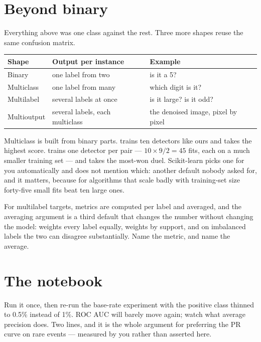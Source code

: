 \documentclass[11pt,a4paper]{article}
\begin{document}
\section{Beyond binary}

Everything above was one class against the rest. Three more shapes reuse the
same confusion matrix.

\begin{center}
\small
\begin{tabular}{llp{}}
\toprule
\textbf{Shape} & \textbf{Output per instance} & \textbf{Example} \\
\midrule
Binary       & one label from two            & is it a 5? \\
Multiclass   & one label from many           & which digit is it? \\
Multilabel   & several labels at once        & is it large? is it odd? \\
Multioutput  & several labels, each multiclass & the denoised image, pixel by
                                                pixel \\
\bottomrule
\end{tabular}
\end{center}

Multiclass is built from binary parts.  trains ten
detectors like ours and takes the highest score.  trains
one detector per pair --- $10\times9/2 = 45$ fits, each on a much smaller
training set --- and takes the most-won duel. Scikit-learn picks one for you
automatically and does not mention which: another default nobody asked for, and
it matters, because for algorithms that scale badly with training-set size
forty-five small fits beat ten large ones.

For multilabel targets, metrics are computed per label and averaged, and the
averaging argument is a third default that changes the number without changing
the model:  weights every label equally,
 weights by support, and on imbalanced labels the two
can disagree substantially. Name the metric, and name the average.

\section{The notebook}

\begin{trybox}[title={What to change}]
Run it once, then re-run the base-rate experiment with the positive class
thinned to 0.5\% instead of 1\%. ROC AUC will barely move again; watch what
average precision does. Two lines, and it is the whole argument for preferring
the PR curve on rare events --- measured by you rather than asserted here.
\end{trybox}
\end{document}
